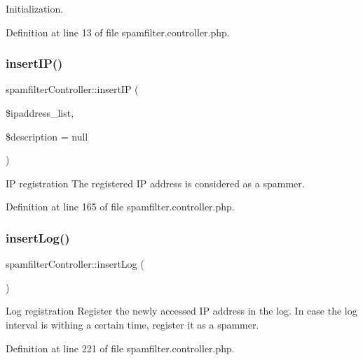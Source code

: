 Initialization. 



Definition at line 13 of file spamfilter.\+controller.\+php.

\hypertarget{classspamfilterController_aab95351e0ebeffec58d24354aa92e3f5}{}\label{classspamfilterController_aab95351e0ebeffec58d24354aa92e3f5} 
\subsubsection{\texorpdfstring{insert\+I\+P()}{insertIP()}}
{\footnotesize\ttfamily spamfilter\+Controller\+::insert\+IP (\begin{DoxyParamCaption}\item[{}]{\$ipaddress\+\_\+list,  }\item[{}]{\$description = {\ttfamily null} }\end{DoxyParamCaption})}



IP registration The registered IP address is considered as a spammer. 



Definition at line 165 of file spamfilter.\+controller.\+php.

\hypertarget{classspamfilterController_a14e2968cb7b9688a6b59b4f02a54a743}{}\label{classspamfilterController_a14e2968cb7b9688a6b59b4f02a54a743} 
\subsubsection{\texorpdfstring{insert\+Log()}{insertLog()}}
{\footnotesize\ttfamily spamfilter\+Controller\+::insert\+Log (\begin{DoxyParamCaption}{ }\end{DoxyParamCaption})}



Log registration Register the newly accessed IP address in the log. In case the log interval is withing a certain time, register it as a spammer. 



Definition at line 221 of file spamfilter.\+controller.\+php.

\hypertarget{classspamfilterController_a31282e59e182dca5e3f94e4c9122578d}{}\label{classspamfilterController_a31282e59e182dca5e3f94e4c9122578d} 
